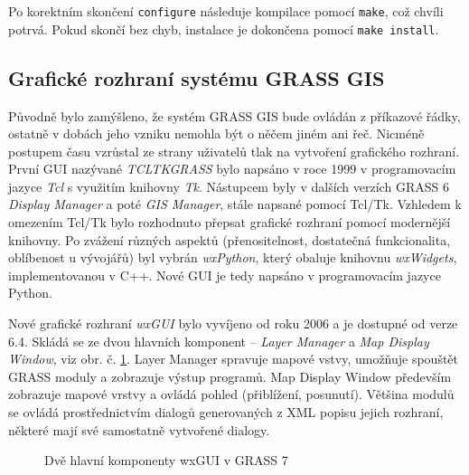 \documentclass[a4paper,12pt,draft]{article}
\begin{document}
Po korektním skončení \verb|configure| následuje kompilace pomocí
\verb|make|, což chvíli potrvá. Pokud skončí bez chyb, instalace je
dokončena pomocí \verb|make install|.


\subsection{Grafické rozhraní systému GRASS GIS}
Původně bylo zamýšleno, že systém GRASS GIS bude ovládán z příkazové
řádky, ostatně v dobách jeho vzniku nemohla být o něčem jiném ani
řeč. Nicméně postupem času vzrůstal ze strany uživatelů tlak na
vytvoření grafického rozhraní. První GUI nazývané \emph{TCLTKGRASS}
bylo napsáno v roce 1999 v programovacím jazyce \emph{Tcl} s využitím
knihovny \emph{Tk}. Nástupcem byly v dalších verzích GRASS 6 \emph{Display
Manager} a poté \emph{GIS Manager}, stále napsané pomocí Tcl/Tk. Vzhledem
k omezením Tcl/Tk bylo rozhodnuto přepsat grafické rozhraní pomocí
modernější knihovny. Po zvážení různých aspektů (přenositelnost,
dostatečná funkcionalita, oblíbenost u vývojářů) byl vybrán
\emph{wxPython}, který obaluje knihovnu \emph{wxWidgets}, implementovanou
v C++. Nové GUI je tedy napsáno v programovacím jazyce Python.

Nové grafické rozhraní \emph{wxGUI} bylo vyvíjeno od roku 2006 a je
dostupné od verze 6.4. Skládá se ze dvou hlavních komponent -- \emph{Layer
Manager} a \emph{Map Display Window}, viz obr. č. \ref{fig:wxgui}. Layer
Manager spravuje mapové vstvy, umožňuje spouštět GRASS moduly a zobrazuje
výstup programů. Map Display Window především zobrazuje mapové vrstvy
a ovládá pohled (přiblížení, posunutí). Většina modulů se ovládá
prostřednictvím dialogů generovaných z XML popisu jejich rozhraní,
některé mají své samostatně vytvořené dialogy.
\begin{figure}[h!]
\centering
{}
\quad
{}
\caption{Dvě hlavní komponenty wxGUI v GRASS 7\label{fig:wxgui}}

\end{figure}
\end{document}
